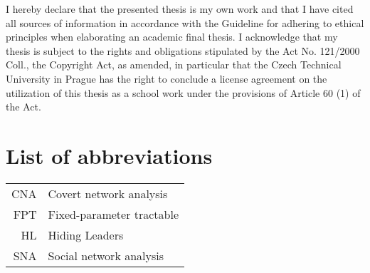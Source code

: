 \documentclass[english,bachelor,unicode]{ctufit-thesis}
\theoremstyle{plain}
\theoremstyle{definition}
\theoremstyle{remark}
\numberwithin{theorem}{chapter}
\begin{document}
\begin{declarationpage}
    I hereby declare that the presented thesis is my own work and that I have cited all sources of information in accordance with the Guideline
    for adhering to ethical principles when elaborating an academic final thesis.
    I acknowledge that my thesis is subject to the rights and obligations stipulated by the Act No. 121/2000 Coll.,
    the Copyright Act, as amended, in particular that the Czech Technical University in Prague has the right to conclude
    a license agreement on the utilization of this thesis as a school work under the provisions of Article 60 (1) of the Act.
\end{declarationpage}


\printabstractpage %


\chapter{List of abbreviations}

\begin{tabular}{rl}
    CNA  & Covert network analysis\\
    FPT  & Fixed-parameter tractable\\
    HL   & Hiding Leaders\\
    SNA  & Social network analysis
\end{tabular}


\mainmatter\mainmatterinit %








%
%

\appendix\appendixinit %


\backmatter %

\printbibliography %

\end{document}
